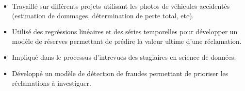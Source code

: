 \documentclass[10pt,a4paper,ragged2e]{altacv}
\begin{document}

\begin{fullwidth}
\makecvheader
\end{fullwidth}



\begin{itemize}
	\item Travaillé sur différents projets utilisant les photos de véhicules accidentés (estimation de dommages, détermination de perte total, etc).
	\item Utilisé des regréssions linéaires et des séries temporelles pour développer un modèle de réserves permettant de prédire la valeur ultime d'une réclamation.
	\item Impliqué dans le processus d'intrevues des stagiaires en science de données.
\end{itemize}

\smallskip

\begin{itemize}
	\item Développé un modèle de détection de fraudes permettant de prioriser les réclamations à investiguer.
\end{itemize}
\end{document}
